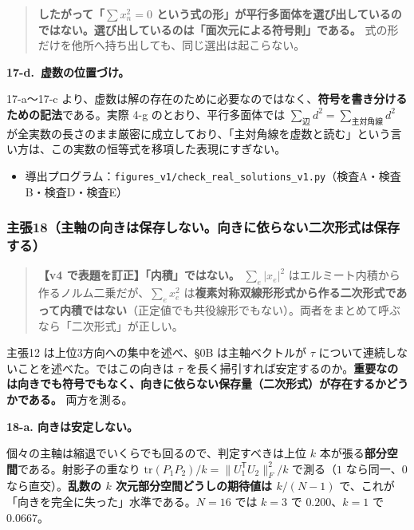 \documentclass[
  10pt,
]{ltjsarticle}
\providecommand{\tightlist}{%
  \setlength{\itemsep}{0pt}\setlength{\parskip}{0pt}}
\begin{document}
\begin{quote}
\textbf{したがって「\(\sum x_n^2 = 0\)
という式の形」が平行多面体を選び出しているのではない。選び出しているのは「面次元による符号則」である。}
式の形だけを他所へ持ち出しても、同じ選出は起こらない。
\end{quote}

\textbf{17-d.~虚数の位置づけ。}

17-a〜17-c
より、虚数は解の存在のために必要なのではなく、\textbf{符号を書き分けるための記法}である。実際
4-g のとおり、平行多面体では \(\sum_{辺}d^2 = \sum_{主対角線}d^2\)
が全実数の長さのまま厳密に成立しており、「主対角線を虚数と読む」という言い方は、この実数の恒等式を移項した表現にすぎない。

\begin{itemize}
\tightlist
\item
  導出プログラム：\texttt{figures\_v1/check\_real\_solutions\_v1.py}（検査A・検査B・検査D・検査E）
\end{itemize}

\subsubsection{主張18（主軸の向きは保存しない。向きに依らない二次形式は保存する）}\label{ux4e3bux5f3518ux4e3bux8ef8ux306eux5411ux304dux306fux4fddux5b58ux3057ux306aux3044ux5411ux304dux306bux4f9dux3089ux306aux3044ux4e8cux6b21ux5f62ux5f0fux306fux4fddux5b58ux3059ux308b}

\begin{quote}
\textbf{【v4 で表題を訂正】「内積」ではない。}
\(\sum_e\lvert x_e\rvert^2\)
はエルミート内積から作るノルム二乗だが、\(\sum_e x_e^2\)
は\textbf{複素対称双線形形式から作る二次形式であって内積ではない}（正定値でも共役線形でもない）。両者をまとめて呼ぶなら「二次形式」が正しい。
\end{quote}

主張12 は上位3方向への集中を述べ、§0B は主軸ベクトルが \(\tau\)
について連続しないことを述べた。ではこの向きは \(\tau\)
を長く掃引すれば安定するのか。\textbf{重要なのは向きでも符号でもなく、向きに依らない保存量（二次形式）が存在するかどうかである。}
両方を測る。

\textbf{18-a. 向きは安定しない。}

個々の主軸は縮退でいくらでも回るので、判定すべきは上位 \(k\)
本が張る\textbf{部分空間}である。射影子の重なり
\(\mathrm{tr}(P_1P_2)/k = \lVert U_1^{\mathsf T}U_2\rVert_F^2/k\)
で測る（\(1\) なら同一、\(0\) なら直交）。\textbf{乱数の \(k\)
次元部分空間どうしの期待値は \(k/(N-1)\)}
で、これが「向きを完全に失った」水準である。\(N=16\) では \(k=3\) で
\(0.200\)、\(k=1\) で \(0.0667\)。
\end{document}
